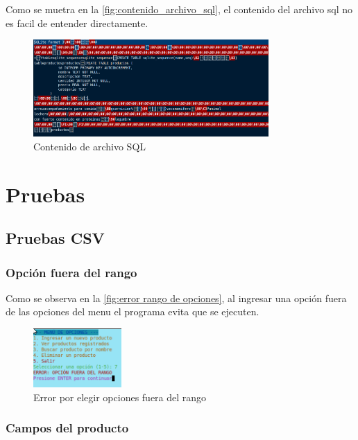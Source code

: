 \documentclass[12pt]{article}
\begin{document}
Como se muetra en la \autoref{fig:contenido_archivo_sql}, el contenido del archivo sql no es facil de entender directamente.

\begin{figure}[H]
	\centering
	\setlength{\fboxrule}{0pt}
	\includegraphics[width=0.8\textwidth]{Imagenes/contenido_archivo_sql.png}
	\caption{Contenido de archivo SQL}
	\label{fig:contenido_archivo_sql}
\end{figure}


\section{Pruebas}

\subsection{Pruebas CSV}
\subsubsection{Opción fuera del rango}

Como se observa en la \autoref{fig:error rango de opciones}, al ingresar una opción fuera de las opciones del menu 
el programa evita que se ejecuten.

\begin{figure}[H]
	\centering
	\setlength{\fboxrule}{0pt}
	\includegraphics[width=0.3\textwidth]{Imagenes/error_opcion_menu.png}
	\caption{Error por elegir opciones fuera del rango}
	\label{fig:error rango de opciones}
\end{figure} 

\subsubsection{Campos del producto}
\end{document}
